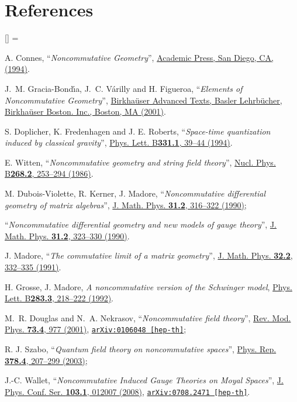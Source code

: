 \documentclass[a4paper,11pt,twoside]{article}
\numberwithin{equation}{section}
\newcommand{\doi}[2]{\href{http://dx.doi.org/#1}{#2}}
\newcommand{\arxiv}[3]{\href{#3}{\texttt{arXiv:#1 [#2]}}}
\theoremstyle{nonumberplain}
\newcounter{and}
\renewenvironment{thebibliography}[1]{%
\section*{References}%
\frenchspacing\small%
\begin{list}{[\arabic{enumi}]}%
{%
\usecounter{enumi}\parsep=2pt\topsep 0pt%
\settowidth{\labelwidth}{[#1]}%
\leftmargin=\labelwidth\advance\leftmargin\labelsep%
\rightmargin=0pt\itemsep=1pt\sloppy%
}%
}{\end{list}}
\begin{document}
\begin{thebibliography}{88} 

%
A. Connes, %
``\emph{Noncommutative Geometry}'', %
\href{http://www.alainconnes.org/en/downloads.php}{Academic Press, San Diego, CA, (1994)}. %

%
J.~M. Gracia-Bond{\'\i}a, J.~C. V{\'a}rilly and H. Figueroa, %
``\emph{Elements of Noncommutative Geometry}'', %
\doi{10.1007/978-1-4612-0005-5}{Birkha\"user Advanced Texts, Basler Lehrb\"ucher, Birkha\"user Boston. Inc., Boston, MA (2001)}.%

%
S. Doplicher, K. Fredenhagen and J. E. Roberts, %
``\emph{Space-time quantization induced by classical gravity}'', %
\doi{10.1016/0370-2693(94)90940-7}{Phys. Lett. B\textbf{331.1}, 39--44 (1994)}.%

%
E. Witten, %
``\emph{Noncommutative geometry and string field theory}'', %
\doi{10.1016/0550-3213(86)90155-0}{Nucl. Phys. B\textbf{268.2}, 253--294 (1986)}.%

M. Dubois-Violette, R. Kerner, J. Madore, %
``\emph{Noncommutative differential geometry of matrix algebras}'', %
\doi{10.1063/1.528916}{J. Math. Phys. \textbf{31.2}, 316--322 (1990)};\par%
``\emph{Noncommutative differential geometry and new models of gauge theory}'', %
\doi{10.1063/1.528917}{J. Math. Phys. \textbf{31.2}, 323--330 (1990)}.%

J. Madore, %
``\emph{The commutative limit of a matrix geometry}'', %
\doi{10.1063/1.529418}{J. Math. Phys. \textbf{32.2}, 332--335 (1991)}.\par%
H. Grosse, J. Madore, %
\emph{A noncommutative version of the Schwinger model}, %
\doi{10.1016/0370-2693(92)90011-R}{Phys. Lett. B\textbf{283.3}, 218--222 (1992)}.%

%
M.~R. Douglas and N.~A. Nekrasov, %
``\emph{Noncommutative field theory}'', %
\doi{10.1103/RevModPhys.73.977}{Rev. Mod. Phys. \textbf{73.4}, 977 (2001)}, %
\arxiv{0106048}{hep-th}{http://arxiv.org/abs/hep-th/0106048};\par%
R. J. Szabo, %
``\emph{Quantum field theory on noncommutative spaces}'', %
\doi{10.1016/S0370-1573(03)00059-0}{Phys. Rep. \textbf{378.4}, 207--299 (2003)};\par%
J.-C. Wallet, %
``\emph{Noncommutative Induced Gauge Theories on Moyal Spaces}'', %
\doi{10.1088/1742-6596/103/1/012007}{J. Phys. Conf. Ser. \textbf{103.1}, 012007 (2008)}, %
\arxiv{0708.2471}{hep-th}{http://arxiv.org/abs/arXiv:0708.2471}.%


\end{thebibliography}
\end{document}

